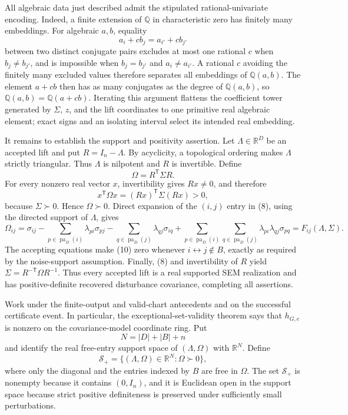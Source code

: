 All algebraic data just described admit the stipulated rational-univariate encoding.  Indeed, a finite extension of \(\mathbb Q\) in characteristic zero has finitely many embeddings.  For algebraic \(a,b\), equality
\[
 a_i+c b_j=a_{i'}+c b_{j'}
\]
between two distinct conjugate pairs excludes at most one rational \(c\) when \(b_j\ne b_{j'}\), and is impossible when \(b_j=b_{j'}\) and \(a_i\ne a_{i'}\).  A rational \(c\) avoiding the finitely many excluded values therefore separates all embeddings of \(\mathbb Q(a,b)\).  The element \(a+cb\) then has as many conjugates as the degree of \(\mathbb Q(a,b)\), so \(\mathbb Q(a,b)=\mathbb Q(a+cb)\).  Iterating this argument flattens the coefficient tower generated by \(\Sigma\), \(z\), and the lift coordinates to one primitive real algebraic element; exact signs and an isolating interval select its intended real embedding.

It remains to establish the support and positivity assertion.  Let \(\Lambda\in\mathbb R^D\) be an accepted lift and put \(R=I_n-\Lambda\).  By acyclicity, a topological ordering makes \(\Lambda\) strictly triangular.  Thus \(\Lambda\) is nilpotent and \(R\) is invertible.  Define
\[
 \Omega=R^{\mathsf T}\Sigma R.                                \tag{8}
\]
For every nonzero real vector \(x\), invertibility gives \(Rx\ne0\), and therefore
\[
 x^{\mathsf T}\Omega x
   =(Rx)^{\mathsf T}\Sigma(Rx)>0,                              \tag{9}
\]
because \(\Sigma\succ0\).  Hence \(\Omega\succ0\).  Direct expansion of the \((i,j)\) entry in (8), using the directed support of \(\Lambda\), gives
\[
 \Omega_{ij}
 =\sigma_{ij}
  -\sum_{p\in\operatorname{pa}_D(i)}\lambda_{pi}\sigma_{pj}
  -\sum_{q\in\operatorname{pa}_D(j)}\lambda_{qj}\sigma_{iq}
  +\sum_{p\in\operatorname{pa}_D(i)}
        \sum_{q\in\operatorname{pa}_D(j)}
        \lambda_{pi}\lambda_{qj}\sigma_{pq}
 =F_{ij}(\Lambda,\Sigma).                                     \tag{10}
\]
The accepting equations make (10) zero whenever \(i\leftrightarrow j\notin B\), exactly as required by the noise-support assumption.  Finally, (8) and invertibility of \(R\) yield \(\Sigma=R^{-\mathsf T}\Omega R^{-1}\).  Thus every accepted lift is a real supported SEM realization and has positive-definite recovered disturbance covariance, completing all assertions.

Work under the finite-output and valid-chart antecedents and on the successful certificate event.  In particular, the exceptional-set-validity theorem says that \(h_{G,e}\) is nonzero on the covariance-model coordinate ring.  Put
\[
 N=|D|+|B|+n
\]
and identify the real free-entry support space of \((\Lambda,\Omega)\) with \(\mathbb R^N\).  Define
\[
 \mathcal S_+
 =\{(\Lambda,\Omega)\in\mathbb R^N:\Omega\succ0\},           \tag{11}
\]
where only the diagonal and the entries indexed by \(B\) are free in \(\Omega\).  The set \(\mathcal S_+\) is nonempty because it contains \((0,I_n)\), and it is Euclidean open in the support space because strict positive definiteness is preserved under sufficiently small perturbations.

